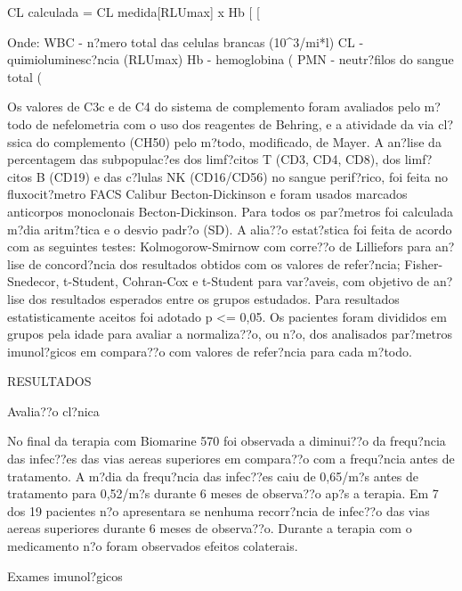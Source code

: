\documentclass[12pt]{article}
\begin{document}
 CL calculada = CL medida[RLUmax] x Hb [%
[%

 Onde:
 WBC -   n?mero total das celulas brancas (10^3/mi*l)
 CL     -   quimioluminesc?ncia (RLUmax)
 Hb     -   hemoglobina (%
 PMN -   neutr?filos do sangue total (%

 Os valores de C3c e de C4 do sistema de complemento foram avaliados
pelo m?todo de nefelometria com o uso dos reagentes de Behring, e a
atividade da via cl?ssica do complemento (CH50) pelo m?todo, modificado, de
Mayer.
 A an?lise da percentagem das subpopulac?es dos limf?citos T (CD3, CD4,
CD8), dos limf?citos B (CD19) e das c?lulas NK (CD16/CD56) no sangue
perif?rico, foi feita no fluxocit?metro FACS Calibur Becton-Dickinson e
foram usados marcados anticorpos monoclonais Becton-Dickinson.
 Para todos os par?metros foi calculada m?dia aritm?tica e o desvio
padr?o (SD). A alia??o estat?stica foi feita de acordo com as seguintes
testes: Kolmogorow-Smirnow com corre??o de Lilliefors para an?lise de
concord?ncia dos resultados obtidos com os valores de refer?ncia;
Fisher-Snedecor, t-Student, Cohran-Cox e t-Student para var?aveis, com objetivo
de an?lise dos resultados esperados entre os grupos estudados. Para
resultados estatisticamente aceitos foi adotado p <= 0,05. Os pacientes
foram divididos em grupos pela idade para avaliar a normaliza??o, ou n?o,
dos analisados par?metros imunol?gicos em compara??o com valores de
refer?ncia para cada m?todo.



 RESULTADOS

 Avalia??o cl?nica

 No final da terapia com Biomarine 570 foi observada a diminui??o da
frequ?ncia das infec??es das vias aereas superiores em compara??o com a
frequ?ncia antes de tratamento. A m?dia da frequ?ncia das infec??es caiu
de 0,65/m?s antes de tratamento para 0,52/m?s durante 6 meses de
observa??o ap?s a terapia. Em 7 dos 19 pacientes n?o apresentara se nenhuma
recorr?ncia de infec??o das vias aereas superiores durante 6 meses de
observa??o.
 Durante a terapia com o medicamento n?o foram observados efeitos
colaterais.

 Exames imunol?gicos
\end{document}
